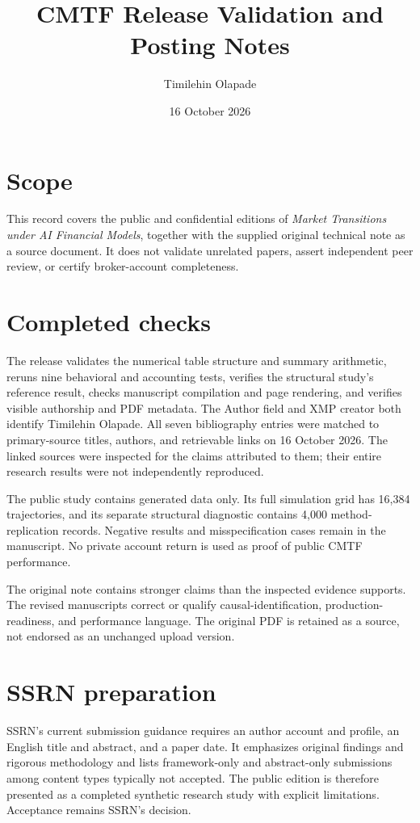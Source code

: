 \documentclass[11pt,a4paper]{article}
\begin{document}
\title{CMTF Release Validation and Posting Notes}
\author{Timilehin Olapade}
\date{16 October 2026}\maketitle
\section*{Scope}
This record covers the public and confidential editions of \emph{Market Transitions under AI Financial Models}, together with the supplied original technical note as a source document. It does not validate unrelated papers, assert independent peer review, or certify broker-account completeness.

\section*{Completed checks}
The release validates the numerical table structure and summary arithmetic, reruns nine behavioral and accounting tests, verifies the structural study's reference result, checks manuscript compilation and page rendering, and verifies visible authorship and PDF metadata. The Author field and XMP creator both identify Timilehin Olapade. All seven bibliography entries were matched to primary-source titles, authors, and retrievable links on 16 October 2026. The linked sources were inspected for the claims attributed to them; their entire research results were not independently reproduced.

The public study contains generated data only. Its full simulation grid has 16,384 trajectories, and its separate structural diagnostic contains 4,000 method-replication records. Negative results and misspecification cases remain in the manuscript. No private account return is used as proof of public CMTF performance.

The original note contains stronger claims than the inspected evidence supports. The revised manuscripts correct or qualify causal-identification, production-readiness, and performance language. The original PDF is retained as a source, not endorsed as an unchanged upload version.

\section*{SSRN preparation}
SSRN's current submission guidance requires an author account and profile, an English title and abstract, and a paper date. It emphasizes original findings and rigorous methodology and lists framework-only and abstract-only submissions among content types typically not accepted. The public edition is therefore presented as a completed synthetic research study with explicit limitations. Acceptance remains SSRN's decision.
\end{document}
